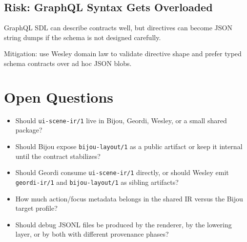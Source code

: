 \subsection{Risk: GraphQL Syntax Gets Overloaded}\label{record-138-risk-graphql-syntax-gets-overloaded}

GraphQL SDL can describe contracts well, but directives can become JSON string dumps if the schema is not designed carefully.

Mitigation: use Wesley domain law to validate directive shape and prefer typed schema contracts over ad hoc JSON blobs.

\section{Open Questions}\label{record-138-open-questions}

\begin{itemize}
\tightlist
\item
  Should \texttt{u\allowbreak{}i\allowbreak{}-\allowbreak{}s\allowbreak{}c\allowbreak{}e\allowbreak{}n\allowbreak{}e\allowbreak{}-\allowbreak{}i\allowbreak{}r\allowbreak{}/\allowbreak{}1} live in Bijou, Geordi, Wesley, or a small shared package?
\item
  Should Bijou expose \texttt{b\allowbreak{}i\allowbreak{}j\allowbreak{}o\allowbreak{}u\allowbreak{}-\allowbreak{}l\allowbreak{}a\allowbreak{}y\allowbreak{}o\allowbreak{}u\allowbreak{}t\allowbreak{}/\allowbreak{}1} as a public artifact or keep it internal until the contract stabilizes?
\item
  Should Geordi consume \texttt{u\allowbreak{}i\allowbreak{}-\allowbreak{}s\allowbreak{}c\allowbreak{}e\allowbreak{}n\allowbreak{}e\allowbreak{}-\allowbreak{}i\allowbreak{}r\allowbreak{}/\allowbreak{}1} directly, or should Wesley emit \texttt{g\allowbreak{}e\allowbreak{}o\allowbreak{}r\allowbreak{}d\allowbreak{}i\allowbreak{}-\allowbreak{}i\allowbreak{}r\allowbreak{}/\allowbreak{}1} and \texttt{b\allowbreak{}i\allowbreak{}j\allowbreak{}o\allowbreak{}u\allowbreak{}-\allowbreak{}l\allowbreak{}a\allowbreak{}y\allowbreak{}o\allowbreak{}u\allowbreak{}t\allowbreak{}/\allowbreak{}1} as sibling artifacts?
\item
  How much action/focus metadata belongs in the shared IR versus the Bijou target profile?
\item
  Should debug JSONL files be produced by the renderer, by the lowering layer, or by both with different provenance phases?
\end{itemize}

